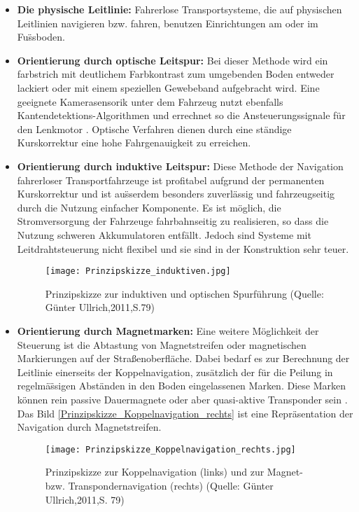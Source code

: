 \begin{itemize}
	\item \textbf{Die physische Leitlinie:}  Fahrerlose Transportsysteme, die auf physischen Leitlinien navigieren bzw. fahren, benutzen Einrichtungen am oder im Fu\"ssboden. 
 \item \textbf{Orientierung durch optische Leitspur:} Bei dieser Methode wird ein farbstrich mit deutlichem Farbkontrast zum umgebenden Boden entweder lackiert oder mit einem speziellen Gewebeband aufgebracht wird. Eine geeignete Kamerasensorik unter dem Fahrzeug nutzt ebenfalls Kantendetektions-Algorithmen  und errechnet so die Ansteuerungssignale f\"ur den Lenkmotor \cite[S. 112]{Guenther:2011}. Optische Verfahren dienen durch eine st\"andige Kurskorrektur eine hohe  Fahrgenauigkeit zu erreichen. 
\item \textbf{Orientierung durch induktive Leitspur:} Diese Methode der Navigation fahrerloser Transportfahrzeuge ist profitabel aufgrund der permanenten Kurskorrektur und ist au\"sserdem besonders zuverl\"assig und fahrzeugseitig durch die Nutzung einfacher Komponente. Es ist m\"oglich, die Stromversorgung der Fahrzeuge fahrbahnseitig zu realisieren, so dass die Nutzung schweren Akkumulatoren entf\"allt. Jedoch sind Systeme mit Leitdrahtsteuerung nicht flexibel und sie sind in der Konstruktion sehr teuer.
\begin{figure}[h!]
	\centering
		\texttt{[image: Prinzipskizze\_induktiven.jpg]}
	\caption{Prinzipskizze zur induktiven und optischen Spurf\"uhrung (Quelle: G\"unter Ullrich,2011,S.79)}
	\label{Prinzipskizze_induktiven}
\end{figure}  
	\item \textbf{Orientierung durch Magnetmarken:} Eine weitere M\"oglichkeit der Steuerung ist die Abtastung von Magnetstreifen oder magnetischen Markierungen auf der Straßenoberfl\"ache. Dabei bedarf es zur Berechnung der Leitlinie einerseits der Koppelnavigation, zus\"atzlich der f\"ur die Peilung in regelm\"a\"ssigen Abst\"anden in den Boden eingelassenen Marken. Diese Marken k\"onnen rein passive Dauermagnete oder aber quasi-aktive Transponder sein \cite[S. 80]{Guenther:2011}. Das Bild \ref{Prinzipskizze_Koppelnavigation_rechts} ist eine Repr\"asentation der Navigation durch Magnetstreifen.
	\begin{figure}[h!]
		\centering
			\texttt{[image: Prinzipskizze\_Koppelnavigation\_rechts.jpg]}
			\caption{Prinzipskizze zur Koppelnavigation (links) und zur Magnet- bzw. Transpondernavigation (rechts) (Quelle: G\"unter Ullrich,2011,S. 79)}

\end{figure}
\end{itemize}
